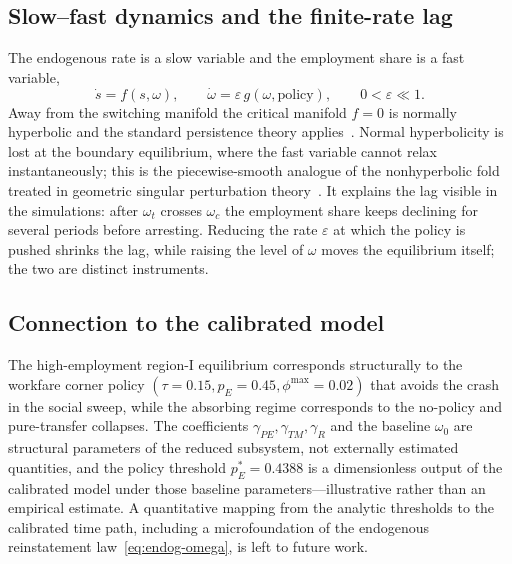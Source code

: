 \documentclass[review,12pt]{elsarticle}
\theoremstyle{plain}
\theoremstyle{definition}
\theoremstyle{remark}
\begin{document}
\subsection{Slow--fast dynamics and the finite-rate lag}
The endogenous rate is a slow variable and the employment share is a fast variable,
\begin{equation}
\dot s=f(s,\omega),\qquad \dot\omega=\varepsilon\,g(\omega,\text{policy}),
\qquad 0<\varepsilon\ll1.
\label{eq:bif-slow}
\end{equation}
Away from the switching manifold the critical manifold $f=0$ is normally hyperbolic and the standard persistence theory applies~\citep{Fenichel1979}. Normal hyperbolicity is lost at the boundary equilibrium, where the fast variable cannot relax instantaneously; this is the piecewise-smooth analogue of the nonhyperbolic fold treated in geometric singular perturbation theory~\citep{KS2001,GH1983,Desroches2012}. It explains the lag visible in the simulations: after $\omega_t$ crosses $\omega_c$ the employment share keeps declining for several periods before arresting. Reducing the rate $\varepsilon$ at which the policy is pushed shrinks the lag, while raising the level of $\omega$ moves the equilibrium itself; the two are distinct instruments.

\subsection{Connection to the calibrated model}
\label{subsec:connection}
The high-employment region-I equilibrium corresponds structurally to the workfare corner policy $(\tau=0.15,p_E=0.45,\phi^{\max}=0.02)$ that avoids the crash in the social sweep, while the absorbing regime corresponds to the no-policy and pure-transfer collapses. The coefficients $\gamma_{PE},\gamma_{TM},\gamma_R$ and the baseline $\omega_0$ are structural parameters of the reduced subsystem, not externally estimated quantities, and the policy threshold $p_E^{*}=0.4388$ is a dimensionless output of the calibrated model under those baseline parameters---illustrative rather than an empirical estimate. A quantitative mapping from the analytic thresholds to the calibrated time path, including a microfoundation of the endogenous reinstatement law~\eqref{eq:endog-omega}, is left to future work.
\end{document}
